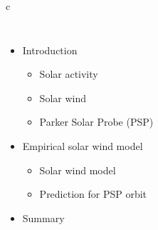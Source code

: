 c{
\begin{frame}[c]{}{}
	\begin{columns}[c]

		
		\Large
		\begin{itemize}
			\item \color{gray} Introduction
			\begin{itemize} \color{gray}
				\item \large Solar activity
				\item Solar wind
				\item Parker Solar Probe (PSP)
			\end{itemize} \color{black}
			\item Empirical solar wind model
			\begin{itemize}
				\item \large Solar wind model
				\item Prediction for PSP orbit
			\end{itemize}
			\item Summary
		\end{itemize}
	\end{columns}
\end{frame}
}


